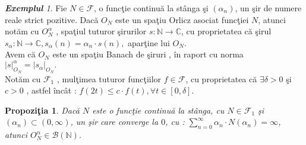 \documentclass[ a4paper, 12pt]{report}
\newtheorem{prop}[theorem]{\bf Propozi\c tia }
\theoremstyle{remark}
\newtheorem{exemple}{\bf Exemplul}[section]
\numberwithin{equation}{section}
\begin{document}
\begin{exemple}
Fie $N \in \mathcal{F}$, o func\c tie continu\u a la st\^anga \c si $(\alpha_n)$, un \c sir de numere reale strict pozitive. Dac\u a $O_N$ este un spa\c tiu Orlicz asociat func\c tiei $N$, atunci not\u am cu $O_N^{\alpha}$ , spa\c tiul tuturor \c sirurilor $s : \mathbb{N} \rightarrow \mathbb{C}$, cu proprietatea c\u a \c sirul $s_{\alpha} : \mathbb{N} \rightarrow \mathbb{C}, s_{\alpha}(n) = \alpha_n \cdot s(n),$ apar\c tine lui $O_N.$\\
Avem c\u a $O_N$ este un spa\c tiu Banach de \c siruri , \^in raport cu norma \\
$\lvert s \rvert_{O_{N}}^{\alpha} = \lvert s_{\alpha}\rvert_{O_{N}}.$ \\
Not\u am cu $\mathcal{F}_{1}$ , mul\c timea tuturor func\c tiilor $f \in \mathcal{F}$, cu proprietatea c\u a $\exists \delta > 0$ \c si $c>0$ , astfel \^inc\^at : $f(2t) \leq c \cdot f(t), \forall t \in [0,\delta].$
\end{exemple}
\begin{prop}
Dac\u a $N$ este o func\c tie continu\u a la st\^anga, cu $N \in \mathcal{F}_{1}$ \c si $(\alpha_n) \subset (0,\infty)$, un \c sir care converge la $0$, cu : $\sum\limits_{n=0}^{\infty} \alpha_n \cdot N(\alpha_n) = \infty$, atunci $O_N^{\alpha} \in \mathcal{B}(\mathbb{N}).$
\end{prop}
\end{document}
